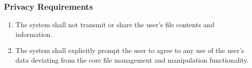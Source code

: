 \documentclass{article}
\begin{document}
\subsubsection{Privacy Requirements}
\begin{enumerate}
    \item The system shall not transmit or share the user's file contents and information.
    \item The system shall explicitly prompt the user to agree to any use of the user's data deviating from the core file management and manipulation functionality.
\end{enumerate}
\end{document}
